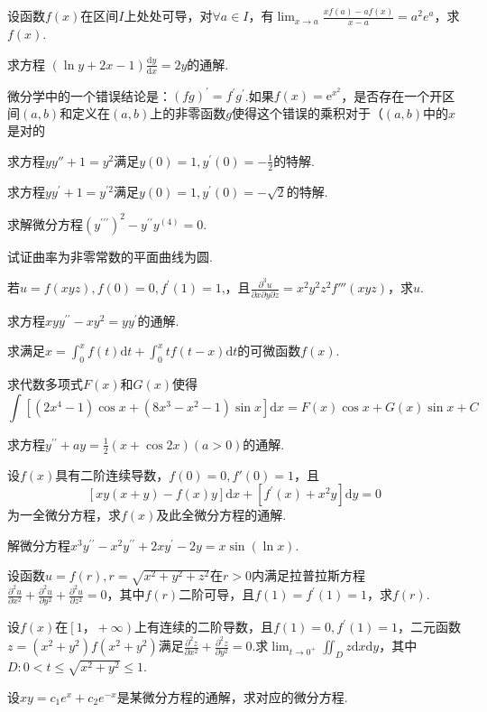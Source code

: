 \begin{xiti}
	\item 	设函数$f(x)$在区间$I$上处处可导，对$\forall a \in I$，有$\lim _{x \rightarrow a} \frac{x f(a)-a f(x)}{x-a}=a^{2} e^{a}$，求$f(x)$.
	\item 求方程 $(\ln y+2 x-1) \frac{\mathrm{d} y}{\mathrm{d} x}=2 y$的通解.
	
	\item 微分学中的一个错误结论是：$(f g)^{\prime}=f^{\prime} g^{\prime}$.如果$f(x)=\mathrm{e}^{x^{2}}$，是否存在一个开区间$(a,b)$和定义在$(a,b)$上的非零函数$g$使得这个错误的乘积对于（$(a,b)$中的$x$是对的
	
	\item 求方程$y y''+1=y^{2}$满足$y(0)=1, y^{\prime}(0)=-\frac{1}{2}$的特解.
	\item 求方程$y y^{\prime}+1=y^{\prime 2}$满足$y(0)=1, y^{\prime}(0)=-\sqrt{2}$的特解.
	
	\item 	求解微分方程$\left(y^{\prime \prime \prime}\right)^{2}-y^{\prime \prime} y^{(4)}=0$.
	\item 试证曲率为非零常数的平面曲线为圆.
	
	\item 若$u=f(x y z), f(0)=0, f^{\prime}(1)=1$,，且$\frac{\partial^{3} u}{\partial x \partial y \partial z}=x^{2} y^{2} z^{2} f'''(x y z)$，求$u$.
	\item 求方程$x y y^{\prime \prime}-x y^{2}=y y^{\prime}$的通解.
	
	\item 求满足$x=\int_{0}^{x} f(t) \mathrm{d} t+\int_{0}^{x} t f(t-x) \mathrm{d} t$的可微函数$f(x)$.
	
	\item 求代数多项式$F(x)$和$G(x)$使得
	\[
	\int[\left(2 x^{4}-1\right) \cos x+\left(8 x^{3}-x^{2}-1\right) \sin x ] \mathrm{d} x=F(x) \cos x+G(x) \sin x+C
	\]	
	\item 求方程$
	y^{\prime \prime}+a y=\frac{1}{2}(x+\cos 2 x)(a>0)$的通解.
	\item 设$f(x)$具有二阶连续导数，$f(0)=0, f'(0)=1$，且
	\[
	[x y(x+y)-f(x) y] \mathrm{d} x+\left[f^{\prime}(x)+x^{2} y\right] \mathrm{d} y=0
	\]
	为一全微分方程，求$f(x)$及此全微分方程的通解.
	\item 解微分方程$x^{3} y^{\prime \prime}-x^{2} y^{\prime \prime}+2 x y^{\prime}-2 y=x \sin (\ln x)$.
	\item 设函数$u=f(r), r=\sqrt{x^{2}+y^{2}+z^{2}}$在$r>0$内满足拉普拉斯方程$\frac{\partial^{2} u}{\partial x^{2}}+\frac{\partial^{2} u}{\partial y^{2}}+\frac{\partial^{2} u}{\partial z^{2}}=0$，其中$f(r)$二阶可导，且$f(1)=f^{\prime}(1)=1$，求$f(r)$.
	
	\item 设$f(x)$在$\left[ 1，+\infty\right) $上有连续的二阶导数，且$f(1)=0, f^{\prime}(1)=1$，二元函数$z=\left(x^{2}+y^{2}\right) f\left(x^{2}+y^{2}\right)$满足$\frac{\partial^{2} z}{\partial x^{2}}+\frac{\partial^{2} z}{\partial y^{2}}=0$.求$\lim _{t \rightarrow 0^{+}} \iint_{D} z \mathrm{d} x \mathrm{d} y$，其中$D : 0<t \leqslant \sqrt{x^{2}+y^{2}} \leqslant 1$.	
	\item 设$x y=c_{1} e^{x}+c_{2} e^{-x}$是某微分方程的通解，求对应的微分方程.
\end{xiti}



